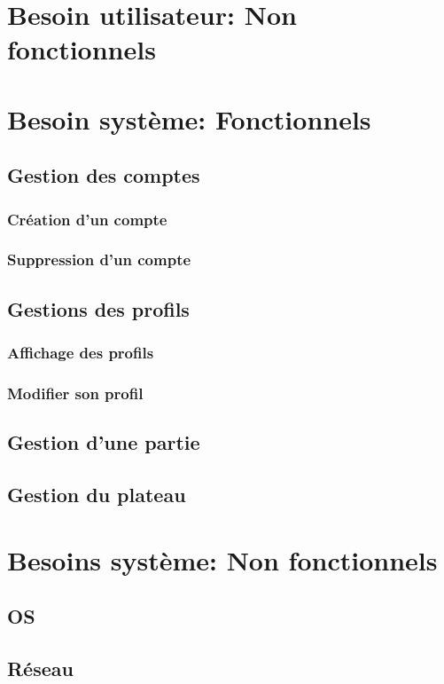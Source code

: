 \documentclass[utf8]{article}
\begin{document}
\section{Besoin utilisateur: Non fonctionnels}


\section{Besoin système: Fonctionnels}
  \subsection{Gestion des comptes}
    \subsubsection{Création d'un compte}
    \subsubsection{Suppression d'un compte}
  \subsection{Gestions des profils}
    \subsubsection{Affichage des profils}
    \subsubsection{Modifier son profil}
  \subsection{Gestion d'une partie}
    \subsection{Gestion du plateau}
  



\section{Besoins système: Non fonctionnels}
  \subsection{OS}
  \subsection{Réseau}
\end{document}
